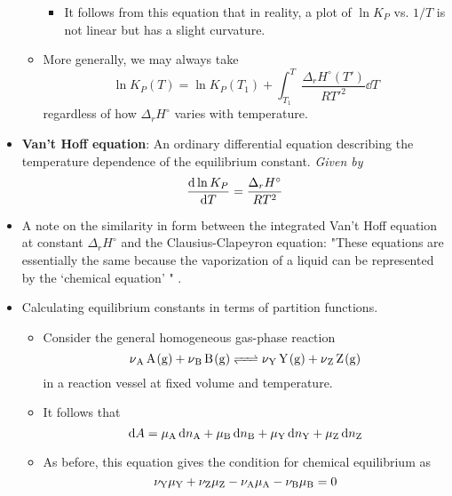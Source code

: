\documentclass[../notes.tex]{subfiles}
\begin{document}
\begin{itemize}
\begin{itemize}
\begin{itemize}
            \item It follows from this equation that in reality, a plot of $\ln K_P$ vs. $1/T$ is not linear but has a slight curvature.
        \end{itemize}
        \item More generally, we may always take
        \begin{equation*}
            \ln K_P(T) = \ln K_P(T_1)+\int_{T_1}^T\frac{\Delta_rH^\circ(T')}{RT'^2}\dd{T}
        \end{equation*}
        regardless of how $\Delta_rH^\circ$ varies with temperature.
    \end{itemize}
    \item \textbf{Van't Hoff equation}: An ordinary differential equation describing the temperature dependence of the equilibrium constant. \emph{Given by}
    \begin{equation*}
        \dv{\ln K_P}{T} = \frac{\Delta_rH^\circ}{RT^2}
    \end{equation*}
    \item A note on the similarity in form between the integrated Van't Hoff equation at constant $\Delta_rH^\circ$ and the Clausius-Clapeyron equation: "These equations are essentially the same because the vaporization of a liquid can be represented by the `chemical equation' " \parencite[980]{bib:McQuarrieSimon}.
    \item {}Calculating equilibrium constants in terms of partition functions.
    \begin{itemize}
        \item Consider the general homogeneous gas-phase reaction
        \begin{equation*}
            \ce{\nu_{\ce{A}} A(g) + \nu_{\ce{B}} B(g) <=> \nu_{\ce{Y}} Y(g) + \nu_{\ce{Z}} Z(g)}
        \end{equation*}
        in a reaction vessel at fixed volume and temperature.
        \item It follows that
        \begin{equation*}
            \dd{A} = \mu_{\ce{A}}\dd{n_{\ce{A}}}+\mu_{\ce{B}}\dd{n_{\ce{B}}}+\mu_{\ce{Y}}\dd{n_{\ce{Y}}}+\mu_{\ce{Z}}\dd{n_{\ce{Z}}}
        \end{equation*}
        \item As before, this equation gives the condition for chemical equilibrium as
        \begin{equation*}
            \nu_{\ce{Y}}\mu_{\ce{Y}}+\nu_{\ce{Z}}\mu_{\ce{Z}}-\nu_{\ce{A}}\mu_{\ce{A}}-\nu_{\ce{B}}\mu_{\ce{B}} = 0

\end{equation*}
\end{itemize}
\end{itemize}
\end{document}
